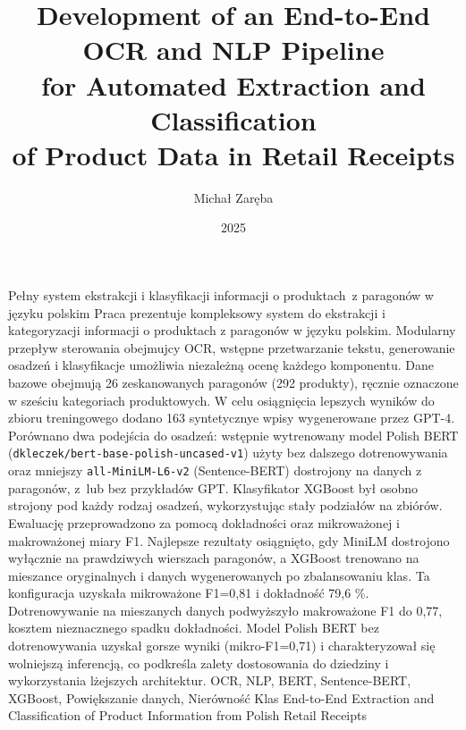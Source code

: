 \documentclass{SGGW-thesis-EN}
\title{Development of an End-to-End\\ OCR and NLP Pipeline\\ for Automated Extraction and Classification\\ of Product Data in Retail Receipts}
\author{Michał Zaręba}
\date{2025}
\begin{document}
\maketitle
\statementpage
\abstractpage
{Pełny system ekstrakcji i klasyfikacji informacji o produktach~z paragonów w języku polskim}
{Praca prezentuje kompleksowy system do ekstrakcji i kategoryzacji informacji o produktach z paragonów w języku polskim. 
Modularny przepływ sterowania obejmujcy OCR, wstępne przetwarzanie tekstu, generowanie osadzeń i klasyfikacje umożliwia niezależną ocenę każdego komponentu. 
Dane bazowe obejmują 26 zeskanowanych paragonów (292 produkty), ręcznie oznaczone w sześciu kategoriach produktowych. 
W celu osiągnięcia lepszych wyników do zbioru treningowego dodano 163 syntetycznye wpisy wygenerowane przez GPT-4.
Porównano dwa podejścia do osadzeń: wstępnie wytrenowany model Polish BERT (\texttt{dkleczek/bert-base-polish-uncased-v1}) użyty bez dalszego dotrenowywania
oraz mniejszy \texttt{all-MiniLM-L6-v2} (Sentence-BERT) dostrojony na danych z paragonów, z~lub bez przykładów GPT.
Klasyfikator XGBoost był osobno strojony pod każdy rodzaj osadzeń, wykorzystując stały podziałów na zbiórów. 
Ewaluację przeprowadzono za pomocą dokładności oraz mikroważonej i makroważonej miary F1.
Najlepsze rezultaty osiągnięto, gdy MiniLM dostrojono wyłącznie na prawdziwych wierszach paragonów, 
a XGBoost trenowano na mieszance oryginalnych i danych wygenerowanych po zbalansowaniu klas. Ta konfiguracja uzyskała mikroważone F1=0,81 i dokładność 79,6 \%. 
Dotrenowywanie na mieszanych danych podwyższyło makroważone F1 do 0,77, kosztem nieznacznego spadku dokładności.
Model Polish BERT bez dotrenowywania uzyskał gorsze wyniki (mikro-F1=0,71) i charakteryzował się wolniejszą inferencją, 
co podkreśla zalety dostosowania do dziedziny i wykorzystania lżejszych architektur.}
{OCR, NLP, BERT, Sentence-BERT, XGBoost, Powiększanie danych, Nierówność Klas}
{End-to-End Extraction and Classification of Product Information from Polish Retail Receipts}
\end{document}
